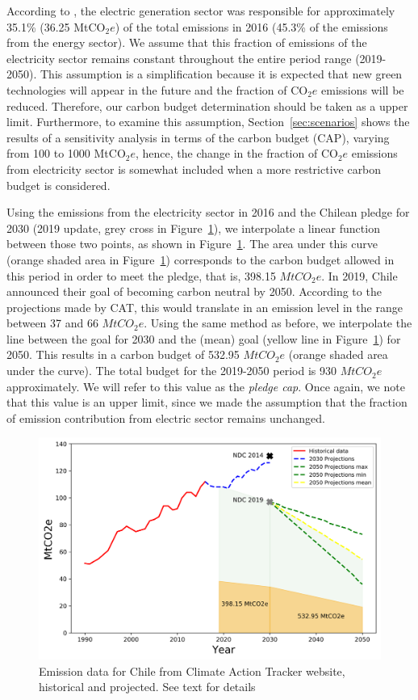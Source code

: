 \documentclass[11pt, letterpaper]{article}
\begin{document}
\smallskip

According to \cite{ChileInformeBienal2016}, the electric generation sector was responsible for approximately 35.1\% (36.25 MtCO$_2e$) of the total emissions in 2016 (45.3\% of the emissions from the energy sector). We assume that this fraction of emissions of the electricity sector remains constant throughout the entire period range (2019-2050). This assumption is a simplification because it is expected that new green technologies will appear in the future and the fraction of CO$_2e$ emissions will be reduced. Therefore, our carbon budget determination should be taken as a upper limit. Furthermore, to examine this assumption, Section~\ref{sec:scenarios} shows the results of a sensitivity analysis in terms of the carbon budget (CAP), varying from 100 to 1000 MtCO$_2e$, hence, the change in the fraction of CO$_2e$ emissions from electricity sector is somewhat included when a more restrictive carbon budget is considered. 

Using the emissions from the electricity sector in 2016 and the Chilean pledge for 2030 (2019 update, grey cross in Figure~\ref{fig:cap}), we interpolate a linear function between those two points, as shown in Figure~\ref{fig:cap}. The area under this curve (orange shaded area in Figure~\ref{fig:cap}) corresponds to the carbon budget allowed in this period in order to meet the pledge, that is, 398.15 $MtCO_2e$. In 2019, Chile announced their goal of becoming carbon neutral by 2050. According to the projections made by CAT, this would translate in an emission level in the range between 37 and 66 $MtCO_2e$. Using the same method as before, we interpolate the line between the goal for 2030 and the (mean) goal (yellow line in Figure~\ref{fig:cap}) for 2050. This results in a carbon budget of 532.95 $MtCO_2e$ (orange shaded area under the curve). The total budget for the 2019-2050 period is 930 $MtCO_2e$ approximately. We will refer to this value as the \textit{pledge cap}. Once again, we note that this value is an upper limit, since we made the assumption that the fraction of emission contribution from electric sector remains unchanged.

\begin{figure}[ht!]
\centering
 \includegraphics[width=5in]{draft_paper/Figures/cap_ext.png}
 \caption{Emission data for Chile from Climate Action Tracker website, historical and projected. See text for details}
  \label{fig:cap}
  \end{figure}
\end{document}
